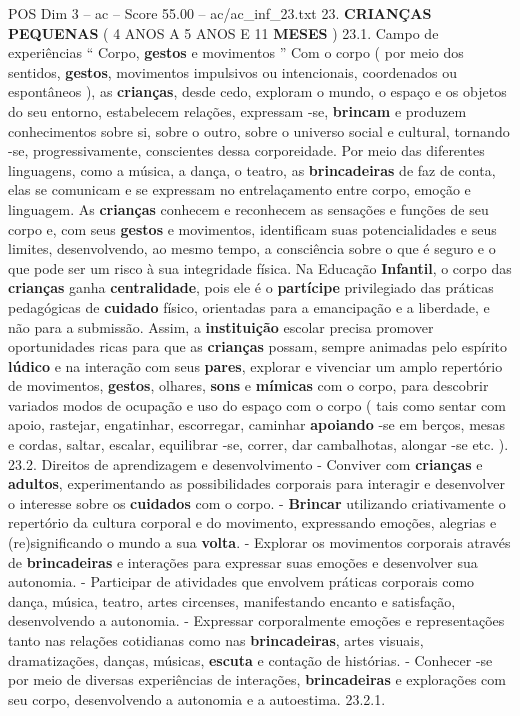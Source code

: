 \begin{textsample}{POS Dim 3 – ac – Score 55.00 – ac/ac\_inf\_23.txt}  \label{ex:f3_pos_021}
23. \textbf{CRIANÇAS} \textbf{PEQUENAS} ( 4 ANOS A 5 ANOS E 11 \textbf{MESES} ) 23.1.
Campo de experiências “ Corpo, \textbf{gestos} e movimentos ” Com o corpo ( por meio dos sentidos, \textbf{gestos}, movimentos impulsivos ou intencionais, coordenados ou espontâneos ), as \textbf{crianças}, desde cedo, exploram o mundo, o espaço e os objetos do seu entorno, estabelecem relações, expressam -se, \textbf{brincam} e produzem conhecimentos sobre si, sobre o outro, sobre o universo social e cultural, tornando -se, progressivamente, conscientes dessa corporeidade.
Por meio das diferentes linguagens, como a música, a dança, o teatro, as \textbf{brincadeiras} de faz de conta, elas se comunicam e se expressam no entrelaçamento entre corpo, emoção e linguagem.
As \textbf{crianças} conhecem e reconhecem as sensações e funções de seu corpo e, com seus \textbf{gestos} e movimentos, identificam suas potencialidades e seus limites, desenvolvendo, ao mesmo tempo, a consciência sobre o que é seguro e o que pode ser um risco à sua integridade física.
Na Educação \textbf{Infantil}, o corpo das \textbf{crianças} ganha \textbf{centralidade}, pois ele é o \textbf{partícipe} privilegiado das práticas pedagógicas de \textbf{cuidado} físico, orientadas para a emancipação e a liberdade, e não para a submissão.
Assim, a \textbf{instituição} escolar precisa promover oportunidades ricas para que as \textbf{crianças} possam, sempre animadas pelo espírito \textbf{lúdico} e na interação com seus \textbf{pares}, explorar e vivenciar um amplo repertório de movimentos, \textbf{gestos}, olhares, \textbf{sons} e \textbf{mímicas} com o corpo, para descobrir variados modos de ocupação e uso do espaço com o corpo ( tais como sentar com apoio, rastejar, engatinhar, escorregar, caminhar \textbf{apoiando} -se em berços, mesas e cordas, saltar, escalar, equilibrar -se, correr, dar cambalhotas, alongar -se etc. ). 23.2.
Direitos de aprendizagem e desenvolvimento - Conviver com \textbf{crianças} e \textbf{adultos}, experimentando as possibilidades corporais para interagir e desenvolver o interesse sobre os \textbf{cuidados} com o corpo. - \textbf{Brincar} utilizando criativamente o repertório da cultura corporal e do movimento, expressando emoções, alegrias e (re)significando o mundo a sua \textbf{volta}. - Explorar os movimentos corporais através de \textbf{brincadeiras} e interações para expressar suas emoções e desenvolver sua autonomia. - Participar de atividades que envolvem práticas corporais como dança, música, teatro, artes circenses, manifestando encanto e satisfação, desenvolvendo a autonomia. - Expressar corporalmente emoções e representações tanto nas relações cotidianas como nas \textbf{brincadeiras}, artes visuais, dramatizações, danças, músicas, \textbf{escuta} e contação de histórias. - Conhecer -se por meio de diversas experiências de interações, \textbf{brincadeiras} e explorações com seu corpo, desenvolvendo a autonomia e a autoestima. 23.2.1.

\end{textsample}
